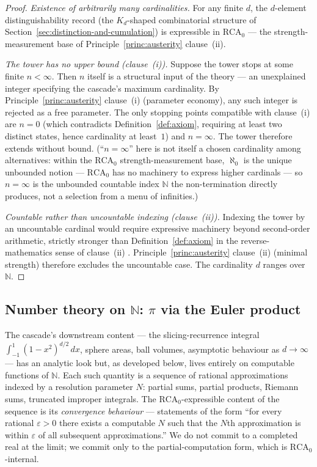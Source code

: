 \documentclass[11pt,a4paper]{article}
\begin{document}
\begin{proof}
\emph{Existence of arbitrarily many cardinalities.} For any finite
$d$, the $d$-element distinguishability record (the $K_d$-shaped
combinatorial structure of Section~\ref{sec:distinction-and-cumulation})
is expressible in $\mathrm{RCA}_0$ \cite{simpson2009} --- the
strength-measurement base of Principle~\ref{princ:austerity}
clause~(ii).

\emph{The tower has no upper bound (clause~(i)).} Suppose the tower
stops at some finite $n<\infty$. Then $n$ itself is a structural
input of the theory --- an unexplained integer specifying the
cascade's maximum cardinality. By Principle~\ref{princ:austerity}
clause~(i) (parameter economy), any such integer is rejected as a
free parameter. The only stopping points compatible with clause~(i)
are $n=0$ (which contradicts Definition~\ref{def:axiom}, requiring at
least two distinct states, hence cardinality at least~$1$) and
$n=\infty$. The tower therefore extends without bound. (``$n=\infty$''
here is not itself a chosen cardinality among alternatives: within
the $\mathrm{RCA}_0$ strength-measurement base, $\aleph_0$ is the
unique unbounded notion --- $\mathrm{RCA}_0$ has no machinery to
express higher cardinals --- so $n=\infty$ is the unbounded countable
index $\mathbb{N}$ the non-termination directly produces, not a
selection from a menu of infinities.)

\emph{Countable rather than uncountable indexing (clause~(ii)).}
Indexing the tower by an uncountable cardinal would require
expressive machinery beyond second-order arithmetic, strictly
stronger than Definition~\ref{def:axiom} in the reverse-mathematics
sense of clause~(ii) \cite{friedman1975,simpson2009}.
Principle~\ref{princ:austerity} clause~(ii) (minimal strength)
therefore excludes the uncountable case. The cardinality $d$ ranges
over $\mathbb{N}$.
\end{proof}

\subsection*{Number theory on \texorpdfstring{$\mathbb{N}$}{N}: \texorpdfstring{$\pi$}{pi} via the Euler product}

The cascade's downstream content --- the slicing-recurrence integral
$\int_{-1}^1 (1-x^2)^{d/2}\,dx$, sphere areas, ball volumes,
asymptotic behaviour as $d\to\infty$ --- has an analytic look but,
as developed below, lives entirely on computable functions of
$\mathbb{N}$. Each such quantity is a sequence of rational
approximations indexed by a resolution parameter $N$: partial sums,
partial products, Riemann sums, truncated improper integrals. The
$\mathrm{RCA}_0$-expressible content of the sequence is its
\emph{convergence behaviour} --- statements of the form ``for every
rational $\varepsilon>0$ there exists a computable $N$ such that the
$N$th approximation is within $\varepsilon$ of all subsequent
approximations.'' We do not commit to a completed real at the limit;
we commit only to the partial-computation form, which is
$\mathrm{RCA}_0$-internal.
\end{document}
